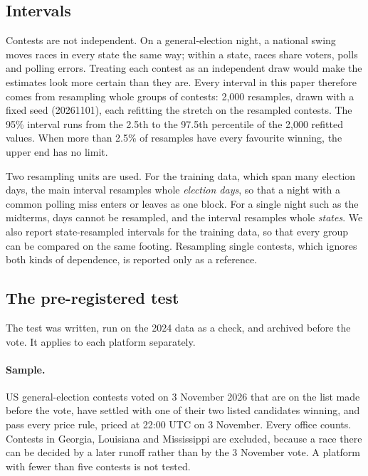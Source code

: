 \subsection{Intervals}

Contests are not independent. On a general-election night, a national swing moves races in every state the same way;
within a state, races share voters, polls and polling errors. Treating each contest as an independent draw would make
the estimates look more certain than they are. Every interval in this paper therefore comes from resampling whole
groups of contests: 2{,}000 resamples, drawn with a fixed seed (20261101), each refitting the stretch on the resampled
contests. The 95\% interval runs from the 2.5th to the 97.5th percentile of the 2{,}000 refitted values. When more than
2.5\% of resamples have every favourite winning, the upper end has no limit.

Two resampling units are used. For the training data, which span many election days, the main interval resamples
whole \emph{election days}, so that a night with a common polling miss enters or leaves as one block. For a single
night such as the midterms, days cannot be resampled, and the interval resamples whole \emph{states}. We also report
state-resampled intervals for the training data, so that every group can be compared on the same footing. Resampling
single contests, which ignores both kinds of dependence, is reported only as a reference.

\subsection{The pre-registered test}

The test was written, run on the 2024 data as a check, and archived before the vote. It applies to each platform
separately.

\paragraph{Sample.} US general-election contests voted on 3 November 2026 that are on the list made before the vote,
have settled with one of their two listed candidates winning, and pass every price rule, priced at 22:00 UTC on
3 November. Every office counts. Contests in Georgia, Louisiana and Mississippi are excluded, because a race there can
be decided by a later runoff rather than by the 3 November vote. A platform with fewer than five contests is not
tested.

